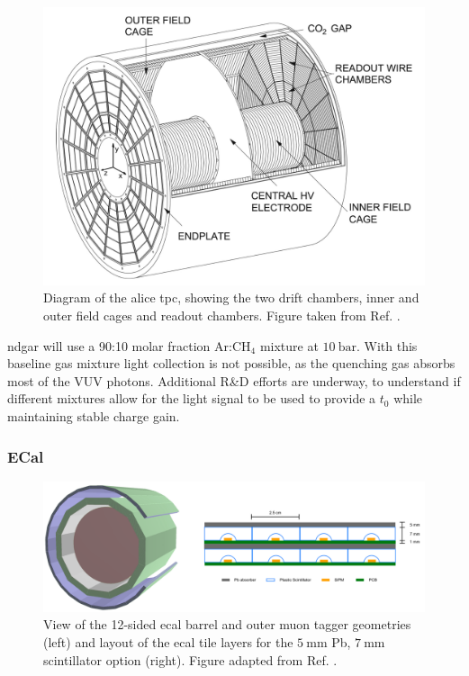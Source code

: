 \begin{figure}[t]
	\centering
	\includegraphics[width=0.7\linewidth]{Images/ND-GAr/alice_tpc}
	\caption[Diagram of the \gls{alice} \gls{tpc}, showing the two drift chambers, inner and outer field cages and readout chambers.]{Diagram of the \gls{alice} \gls{tpc}, showing the two drift chambers, inner and outer field cages and readout chambers. Figure taken from Ref. \cite{DUNE2021NDCDR}.}
	\label{fig:alice_tpc}
\end{figure}

\gls{ndgar} will use a 90:10 molar fraction $\mathrm{Ar}$:$\mathrm{CH}_{4}$ mixture at $10~\mathrm{bar}$. With this baseline gas mixture light collection is not possible, as the quenching gas absorbs most of the VUV photons. Additional R\&D efforts are underway, to understand if different mixtures allow for the light signal to be used to provide a $t_{0}$ while maintaining stable charge gain.

\subsubsection{ECal}

\begin{figure}[t]
	\centering
	\includegraphics[width=0.99\linewidth]{Images/ND-GAr/ndgar_ecal}
	\caption[View of the 12-sided \gls{ecal} barrel and outer muon tagger geometries of \gls{ndgar}.]{View of the 12-sided \gls{ecal} barrel and outer muon tagger geometries (left) and layout of the \gls{ecal} tile layers for the $5~\mathrm{mm}$ Pb, $7~\mathrm{mm}$ scintillator option (right). Figure adapted from Ref. \cite{DUNE2021NDCDR}.}
	\label{fig:ndgar_ecal}
\end{figure}

